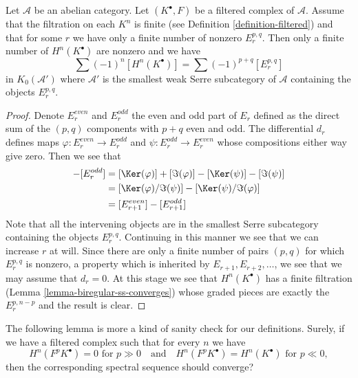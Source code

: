 \begin{lemma}
\label{lemma-biregular-ss-relation-in-K0}
Let $\mathcal{A}$ be an abelian category. Let $(K^\bullet, F)$ be a
filtered complex of $\mathcal{A}$. Assume that the filtration on each $K^n$
is finite (see Definition \ref{definition-filtered}) and that for some
$r$ we have only a finite number of nonzero $E_r^{p, q}$. Then
only a finite number of $H^n(K^\bullet)$ are nonzero and we have
$$
\sum (-1)^n[H^n(K^\bullet)] = \sum (-1)^{p + q} [E_r^{p, q}]
$$
in $K_0(\mathcal{A}')$ where $\mathcal{A}'$ is the smallest weak
Serre subcategory of $\mathcal{A}$ containing the objects
$E_r^{p, q}$.
\end{lemma}

\begin{proof}
Denote $E_r^{even}$ and $E_r^{odd}$ the even and odd part of $E_r$
defined as the direct sum of the $(p, q)$ components with $p + q$ even
and odd. The differential $d_r$ defines maps
$\varphi : E_r^{even} \to E_r^{odd}$ and $\psi : E_r^{odd} \to E_r^{even}$
whose compositions either way give zero.
Then we see that
\begin{align*}
[E_r^{even}] - [E_r^{odd}] & =
[\Ker(\varphi)] + [\Im(\varphi)] - [\Ker(\psi)] - [\Im(\psi)] \\
& =
[\Ker(\varphi)/\Im(\psi)] - [\Ker(\psi)/\Im(\varphi)] \\
& =
[E_{r + 1}^{even}] - [E_{r + 1}^{odd}]
\end{align*}
Note that all the intervening objects are in the smallest Serre
subcategory containing the objects $E_r^{p, q}$.
Continuing in this manner we see that we can increase $r$ at will.
Since there are only a finite number of pairs $(p, q)$ for which
$E_r^{p, q}$ is nonzero, a property which is inherited by
$E_{r + 1}, E_{r + 2}, \ldots$, we see that we may assume that $d_r = 0$.
At this stage we see that $H^n(K^\bullet)$ has a finite filtration
(Lemma \ref{lemma-biregular-ss-converges}) whose graded pieces
are exactly the $E_r^{p, n - p}$ and the result is clear.
\end{proof}

\noindent
The following lemma is more a kind of sanity check for our definitions.
Surely, if we have a filtered complex such that for every $n$ we have
$$
H^n(F^pK^\bullet) = 0\text{ for }p \gg 0
\quad\text{and}\quad
H^n(F^pK^\bullet) = H^n(K^\bullet)\text{ for }p \ll 0,
$$
then the corresponding spectral sequence should converge?

